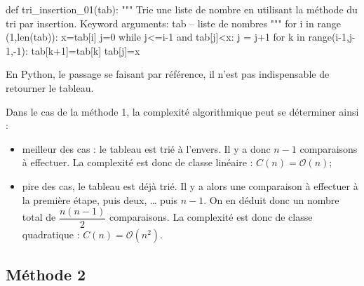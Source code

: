\documentclass[10pt,fleqn]{article} %
\newcommand{\tsf}[1]{\small{\texttt{#1}}}
\begin{document}
\begin{py}
\begin{python}
def tri_insertion_01(tab):
    """ 
    Trie une liste de nombre en utilisant la méthode du tri par insertion.
    Keyword arguments:
        tab -- liste de nombres
    """
    for i in range (1,len(tab)):
        x=tab[i]
        j=0
        while j<=i-1 and tab[j]<x:
            j = j+1
        for k in range(i-1,j-1,-1):
            tab[k+1]=tab[k]
        tab[j]=x
\end{python}
\end{py}
%

 
\begin{rem}
  En Python, le passage se faisant par référence, il n'est pas indispensable de retourner le tableau.
\end{rem} 

Dans le cas de la méthode 1, la complexité algorithmique peut se déterminer ainsi : 
\begin{itemize}
\item meilleur des cas : le tableau est trié à l'envers. Il y a donc $n - 1$ comparaisons à effectuer. La complexité est donc de classe linéaire : $C(n)=\mathcal{O}(n)$;
\item pire des cas, le tableau est déjà trié. Il y a alors une comparaison à effectuer à la première étape, puis deux, … puis $n-1$. On en déduit donc un nombre total de $\dfrac{n\left(n-1\right)}{2}$ comparaisons. La complexité est donc de classe quadratique : $C(n)=\mathcal{O}\left(n^2\right)$.
\end{itemize}

\subsection{Méthode 2}
\end{document}
